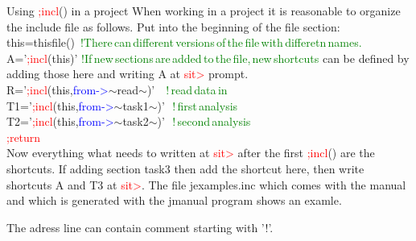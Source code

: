 \begin{note}
Using \textcolor{Red}{;incl}() in a project
When working in a project it is reasonable to organize
the include file as follows. Put into the beginning of the file section:\\
this=\textcolor{VioletRed}{thisfile}() \,\textcolor{green}{!There\,can\,different\,versions\,of\,the\,file\,with\,differetn\,names.\\}
A='\textcolor{Red}{;incl}(this)' \textcolor{green}{!If\,new\,sections\,are\,added\,to\,the\,file,\,new\,shortcuts}
can be defined by adding those here and writing A at \textcolor{Red}{sit>} prompt.\\
R='\textcolor{Red}{;incl}(this,\textcolor{blue}{from->}$\sim$read$\sim$)' \,\,\,\,\textcolor{green}{!\,read\,data\,in\,\\}
T1='\textcolor{Red}{;incl}(this,\textcolor{blue}{from->}$\sim$task1$\sim$)' \,\,\textcolor{green}{!\,first\,analysis\,\\}
T2='\textcolor{Red}{;incl}(this,\textcolor{blue}{from->}$\sim$task2$\sim$)' \,\,\textcolor{green}{!\,second\,analysis\,\\}
\textcolor{Red}{;return} \\
Now everything what needs to written at \textcolor{Red}{sit>} after the first
\textcolor{Red}{;incl}() are the shortcuts. If adding section task3 then
add the shortcut here, then write shortcuts A and T3 at \textcolor{Red}{sit>}.
The file jexamples.inc which comes with the manual and which is generated
with the jmanual program shows an examle.
\end{note}
\begin{note}
The adress line can contain comment starting with '!'.
\end{note}

